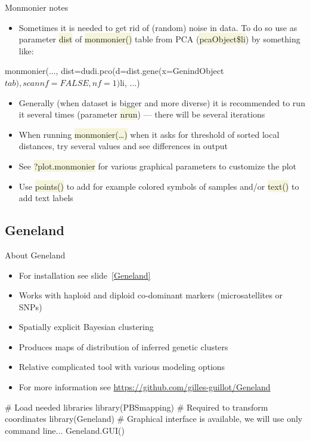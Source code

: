 \documentclass[compress, xelatex, 11pt, xcolor=svgnames, aspectratio=169, url={hyphens, lowtilde}]{beamer}
\renewcommand{\texttt}[1]{\colorbox{Beige}{{\ttfamily #1}}}
\begin{document}
\begin{frame}[fragile]{Monmonier notes}
	\begin{itemize}
		\item Sometimes it is needed to get rid of (random) noise in data. To do so use as parameter \texttt{dist} of \texttt{monmonier()} table from PCA (\texttt{pcaObject\$li}) by something like:
	\end{itemize}
	\begin{spluscode}
    monmonier(..., dist=dudi.pco(d=dist.gene(x=GenindObject$tab),
      scannf=FALSE, nf=1)$li, ...)
	\end{spluscode}
	\begin{itemize}
		\item Generally (when dataset is bigger and more diverse) it is recommended to run it several times (parameter \texttt{nrun}) --- there will be several iterations
		\item When running \texttt{monmonier(\ldots)} when it asks for threshold of sorted local distances, try several values and see differences in output
		\item See \texttt{?plot.monmonier} for various graphical parameters to customize the plot
		\item Use \texttt{points()} to add for example colored symbols of samples and/or \texttt{text()} to add text labels
	\end{itemize}
\end{frame}

\subsection{Geneland}

\begin{frame}[fragile]{About Geneland}
	\label{GenelandUse}
	\begin{itemize}
		\item For installation see slide~\ref{Geneland}
		\item Works with haploid and diploid co-dominant markers (microsatellites or SNPs)
		\item Spatially explicit Bayesian clustering
		\item Produces maps of distribution of inferred genetic clusters
		\item Relative complicated tool with various modeling options
		\item For more information see \url{https://github.com/gilles-guillot/Geneland}
	\end{itemize}
	\vfill
	\begin{spluscode}
    # Load needed libraries
    library(PBSmapping) # Required to transform coordinates
    library(Geneland)
    # Graphical interface is available, we will use only command line...
    Geneland.GUI()
	\end{spluscode}
\end{frame}
\end{document}

